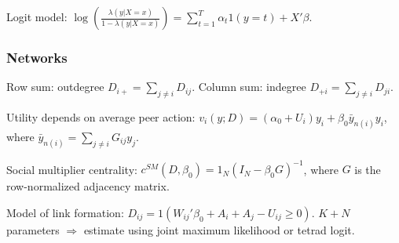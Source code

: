 \documentclass{article}
\begin{document}
Logit model: $\log \left( \frac{\lambda(y|X=x)}{1- \lambda(y|X=x)} \right) = \sum \limits_{t=1}^T \alpha_t 1(y = t) + X'\beta$.

\subsubsection*{Networks}

Row sum: outdegree $D_{i+} = \sum \limits_{j \neq i} D_{ij}$. Column sum: indegree $D_{+i} = \sum \limits_{j \neq i} D_{ji}$.

Utility depends on average peer action: $v_i(y;D) = (\alpha_0 + U_i)y_i + \beta_0 \bar{y}_{n(i)} y_i$, where $\bar{y}_{n(i)} = \sum \limits_{j \neq i} G_{ij} y_j$.

Social multiplier centrality: $c^{SM}(D, \beta_0) = 1_N (I_N - \beta_0 G)^{-1}$, where $G$ is the row-normalized adjacency matrix.

Model of link formation: $D_{ij} = 1(W_{ij}' \beta_0 + A_i + A_j - U_{ij} \geq 0)$. $K + N$ parameters $\Rightarrow$ estimate using joint maximum likelihood or tetrad logit.
\end{document}
